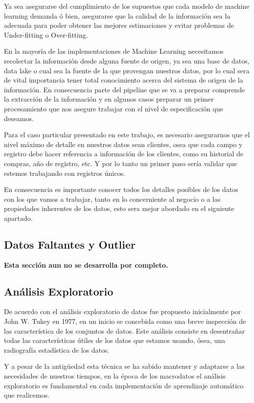 Ya sea asegurarse del cumplimiento de los supuestos que cada modelo de machine learning demanda ó bien, asegurarse que la calidad de la información sea la adecuada para poder obtener las mejores estimaciones y evitar problemas de Under-fitting o Over-fitting.


En la mayoría de las implementaciones de Machine Learning necesitamos recolectar la información desde alguna fuente de origen, ya sea una base de datos, data lake o cual sea la fuente de la que provengan nuestros datos, por lo cual sera de vital importancia tener total conocimiento acerca del sistema de origen de la información. En consecuencia parte del pipeline que se va a preparar comprende la extracción de la información y en algunos casos preparar un primer procesamiento que nos asegure trabajar con el nivel de especificación que deseamos.

Para el caso particular presentado en este trabajo, es necesario asegurarnos que el nivel máximo de detalle en nuestros datos sean clientes, osea que cada campo y registro debe hacer referencia a información de los clientes, como su historial de compras, año de registro, etc. Y por lo tanto un primer paso sería validar que estemos trabajando con registros únicos.

En consecuencia es importante conocer todos los detalles posibles de los datos con los que vamos a trabajar, tanto en lo concerniente al negocio o a las propiedades inherentes de los datos, esto sera mejor abordado en el siguiente apartado.

\subsection{Datos Faltantes y Outlier}

\textbf{Esta sección aun no se desarrolla por completo.}

\subsection{Análisis Exploratorio}

De acuerdo con \citep{EstadisticaPracticacd} el análisis exploratorio de datos fue propuesto inicialmente por John W. Tukey en 1977, en un inicio se concebida como una breve inspección de las característica de los conjuntos de datos. Este análisis consiste en desentrañar todas las características útiles de los datos que estamos usando, ósea, una radiografía estadística de los datos.

Y a pesar de la antigüedad esta técnica se ha sabido mantener y adaptarse a las necesidades de nuestros tiempos, en la época de los macrodatos el análisis exploratorio es fundamental en cada implementación de aprendizaje automático que realicemos.


